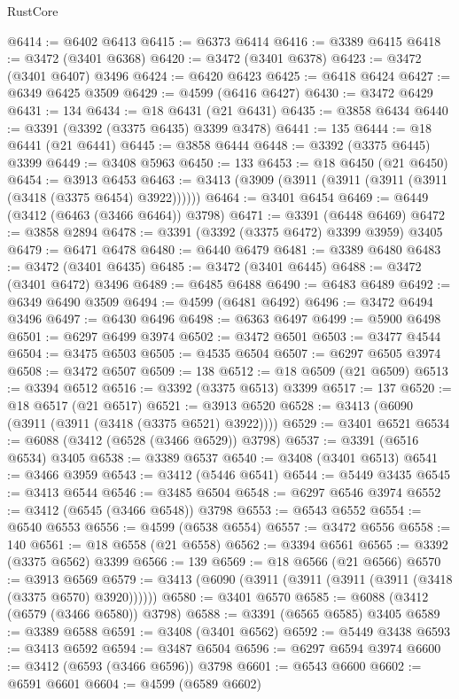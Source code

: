 \begin{lexlean}{RustCore}
\begin{coremodule}
@6414 := @6402 @6413
@6415 := @6373 @6414
@6416 := @3389 @6415
@6418 := @3472 (@3401 @6368)
@6420 := @3472 (@3401 @6378)
@6423 := @3472 (@3401 @6407) @3496
@6424 := @6420 @6423
@6425 := @6418 @6424
@6427 := @6349 @6425 @3509
@6429 := @4599 (@6416 @6427)
@6430 := @3472 @6429
@6431 := 134
@6434 := @18 @6431 (@21 @6431)
@6435 := @3858 @6434
@6440 := @3391 (@3392 (@3375 @6435) @3399 @3478)
@6441 := 135
@6444 := @18 @6441 (@21 @6441)
@6445 := @3858 @6444
@6448 := @3392 (@3375 @6445) @3399
@6449 := @3408 @5963
@6450 := 133
@6453 := @18 @6450 (@21 @6450)
@6454 := @3913 @6453
@6463 := @3413 (@3909 (@3911 (@3911 (@3911 (@3911 (@3418 (@3375 @6454) @3922))))))
@6464 := @3401 @6454
@6469 := @6449 (@3412 (@6463 (@3466 @6464)) @3798)
@6471 := @3391 (@6448 @6469)
@6472 := @3858 @2894
@6478 := @3391 (@3392 (@3375 @6472) @3399 @3959) @3405
@6479 := @6471 @6478
@6480 := @6440 @6479
@6481 := @3389 @6480
@6483 := @3472 (@3401 @6435)
@6485 := @3472 (@3401 @6445)
@6488 := @3472 (@3401 @6472) @3496
@6489 := @6485 @6488
@6490 := @6483 @6489
@6492 := @6349 @6490 @3509
@6494 := @4599 (@6481 @6492)
@6496 := @3472 @6494 @3496
@6497 := @6430 @6496
@6498 := @6363 @6497
@6499 := @5900 @6498
@6501 := @6297 @6499 @3974
@6502 := @3472 @6501
@6503 := @3477 @4544
@6504 := @3475 @6503
@6505 := @4535 @6504
@6507 := @6297 @6505 @3974
@6508 := @3472 @6507
@6509 := 138
@6512 := @18 @6509 (@21 @6509)
@6513 := @3394 @6512
@6516 := @3392 (@3375 @6513) @3399
@6517 := 137
@6520 := @18 @6517 (@21 @6517)
@6521 := @3913 @6520
@6528 := @3413 (@6090 (@3911 (@3911 (@3418 (@3375 @6521) @3922))))
@6529 := @3401 @6521
@6534 := @6088 (@3412 (@6528 (@3466 @6529)) @3798)
@6537 := @3391 (@6516 @6534) @3405
@6538 := @3389 @6537
@6540 := @3408 (@3401 @6513)
@6541 := @3466 @3959
@6543 := @3412 (@5446 @6541)
@6544 := @5449 @3435
@6545 := @3413 @6544
@6546 := @3485 @6504
@6548 := @6297 @6546 @3974
@6552 := @3412 (@6545 (@3466 @6548)) @3798
@6553 := @6543 @6552
@6554 := @6540 @6553
@6556 := @4599 (@6538 @6554)
@6557 := @3472 @6556
@6558 := 140
@6561 := @18 @6558 (@21 @6558)
@6562 := @3394 @6561
@6565 := @3392 (@3375 @6562) @3399
@6566 := 139
@6569 := @18 @6566 (@21 @6566)
@6570 := @3913 @6569
@6579 := @3413 (@6090 (@3911 (@3911 (@3911 (@3911 (@3418 (@3375 @6570) @3920))))))
@6580 := @3401 @6570
@6585 := @6088 (@3412 (@6579 (@3466 @6580)) @3798)
@6588 := @3391 (@6565 @6585) @3405
@6589 := @3389 @6588
@6591 := @3408 (@3401 @6562)
@6592 := @5449 @3438
@6593 := @3413 @6592
@6594 := @3487 @6504
@6596 := @6297 @6594 @3974
@6600 := @3412 (@6593 (@3466 @6596)) @3798
@6601 := @6543 @6600
@6602 := @6591 @6601
@6604 := @4599 (@6589 @6602)

\end{coremodule}
\end{lexlean}
